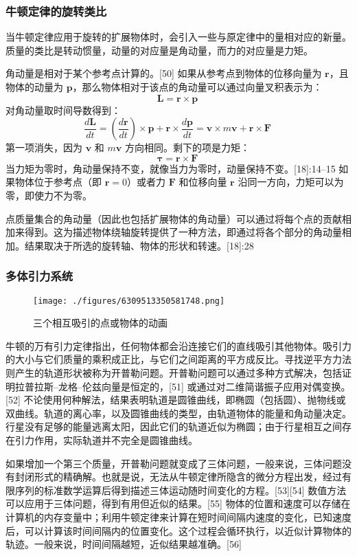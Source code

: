 \subsubsection{牛顿定律的旋转类比}  
当牛顿定律应用于旋转的扩展物体时，会引入一些与原定律中的量相对应的新量。质量的类比是转动惯量，动量的对应量是角动量，而力的对应量是力矩。

角动量是相对于某个参考点计算的。[50] 如果从参考点到物体的位移向量为 \( \mathbf{r} \)，且物体的动量为 \( \mathbf{p} \)，那么物体相对于该点的角动量可以通过向量叉积表示为：
\[
\mathbf{L} = \mathbf{r} \times \mathbf{p}~
\]
对角动量取时间导数得到：
\[
\frac{d\mathbf{L}}{dt} = \left( \frac{d\mathbf{r}}{dt} \right) \times \mathbf{p} + \mathbf{r} \times \frac{d\mathbf{p}}{dt} = \mathbf{v} \times m\mathbf{v} + \mathbf{r} \times \mathbf{F}~
\]
第一项消失，因为 \( \mathbf{v} \) 和 \( m\mathbf{v} \) 方向相同。剩下的项是力矩：
\[
\mathbf{\tau} = \mathbf{r} \times \mathbf{F}~
\]
当力矩为零时，角动量保持不变，就像当力为零时，动量保持不变。[18]:14–15 如果物体位于参考点（即 \( \mathbf{r} = 0 \)）或者力 \( \mathbf{F} \) 和位移向量 \( \mathbf{r} \) 沿同一方向，力矩可以为零，即使力不为零。

点质量集合的角动量（因此也包括扩展物体的角动量）可以通过将每个点的贡献相加来得到。这为描述物体绕轴旋转提供了一种方法，即通过将各个部分的角动量相加。结果取决于所选的旋转轴、物体的形状和转速。[18]:28
\subsubsection{多体引力系统}  
\begin{figure}[ht]
\centering
\texttt{[image: ./figures/6309513350581748.png]}
\caption{三个相互吸引的点或物体的动画} \label{fig_NEW01_9}
\end{figure}
牛顿的万有引力定律指出，任何物体都会沿连接它们的直线吸引其他物体。吸引力的大小与它们质量的乘积成正比，与它们之间距离的平方成反比。寻找逆平方力法则产生的轨道形状被称为开普勒问题。开普勒问题可以通过多种方式解决，包括证明拉普拉斯–龙格–伦兹向量是恒定的，[51] 或通过对二维简谐振子应用对偶变换。[52] 不论使用何种解法，结果表明轨道是圆锥曲线，即椭圆（包括圆）、抛物线或双曲线。轨道的离心率，以及圆锥曲线的类型，由轨道物体的能量和角动量决定。行星没有足够的能量逃离太阳，因此它们的轨道近似为椭圆；由于行星相互之间存在引力作用，实际轨道并不完全是圆锥曲线。

如果增加一个第三个质量，开普勒问题就变成了三体问题，一般来说，三体问题没有封闭形式的精确解。也就是说，无法从牛顿定律所隐含的微分方程出发，经过有限序列的标准数学运算后得到描述三体运动随时间变化的方程。[53][54] 数值方法可以应用于三体问题，得到有用但近似的结果。[55] 物体的位置和速度可以存储在计算机的内存变量中；利用牛顿定律来计算在短时间间隔内速度的变化，已知速度后，可以计算该时间间隔内的位置变化。这个过程会循环执行，以近似计算物体的轨迹。一般来说，时间间隔越短，近似结果越准确。[56]
